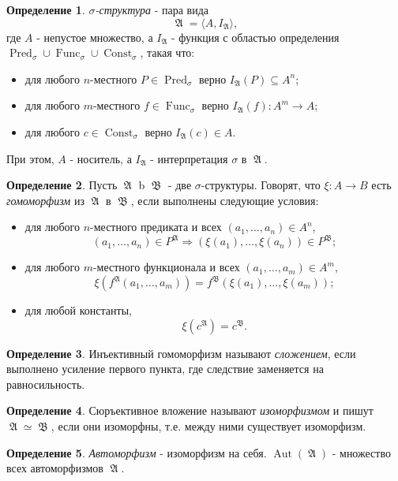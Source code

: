 \documentclass[a4paper,100pt]{article}
\theoremstyle{indented}
\theoremstyle{definition}
\newtheorem{defn}{Определение}
\theoremstyle{remark}
\DeclareMathOperator{\ra}{\rightarrow}
\DeclareMathOperator{\Ra}{\Rightarrow}
\DeclareMathOperator{\Pred}{Pred}
\DeclareMathOperator{\Func}{Func}
\DeclareMathOperator{\Const}{Const}
\DeclareMathOperator{\Aut}{Aut}
\DeclareMathOperator{\GA}{\mathfrak{A}}
\DeclareMathOperator{\GB}{\mathfrak{B}}
\begin{document}
\begin{defn}
  \textit{$\sigma$-структура} - пара вида 
  \[
    \GA = \langle A, I_{\GA}\rangle, 
  \]
  где $A$ - непустое множество, а $I_{\GA}$ - функция с областью определения $\Pred_\sigma \cup \Func_\sigma \cup \Const_\sigma$, такая что:

  \begin{itemize}
    \item для любого $n$-местного $P\in \Pred_\sigma$ верно $I_{\GA}(P)\subseteq A^n$; 
    \item для любого $m$-местного $f\in \Func_\sigma$ верно $I_{\GA}(f):A^m\ra A$; 
    \item для любого $c\in\Const_\sigma$ верно $I_{\GA}(c)\in A$. 
  \end{itemize}

  При этом, $A$ - носитель, а $I_{\GA}$ - интерпретация $\sigma$ в $\GA$. 
\end{defn}

\begin{defn}
  Пусть $\GA$ b $\GB$ - две $\sigma$-структуры. Говорят, что $\xi: A\ra B$ есть \textit{гомоморфизм} из $\GA$ в $\GB$, если выполнены следующие условия:

  \begin{itemize}
    \item для любого $n$-местного предиката и всех $(a_1, \ldots, a_n)\in A^n$, 
    \[
      (a_1, \ldots, a_n)\in P^{\GA} \Ra (\xi(a_1), \ldots, \xi(a_n)) \in P^{\GB}; 
    \]
    \item для любого $m$-местного функционала и всех $(a_1, \ldots, a_m)\in A^m$, 
    \[
      \xi(f^{\GA}(a_1, \ldots, a_m))=f^{\GB}(\xi(a_1), \ldots, \xi(a_m)); 
    \]
    \item для любой константы, 
    \[
      \xi(c^{\GA})=c^{\GB}.
    \]
  \end{itemize}
\end{defn}

\begin{defn}
  Инъективный гомоморфизм называют \textit{сложением}, если выполнено усиление первого пункта, где следствие заменяется на равносильность.
\end{defn}

\begin{defn}
  Сюръективное вложение называют \textit{изоморфизмом} и пишут $\GA \simeq \GB$, если они изоморфны, т.е. между ними существует изоморфизм.
\end{defn}

\begin{defn}
  \textit{Автоморфизм} - изоморфизм на себя. $\Aut(\GA)$ - множество всех автоморфизмов $\GA$. 
\end{defn}
\end{document}
